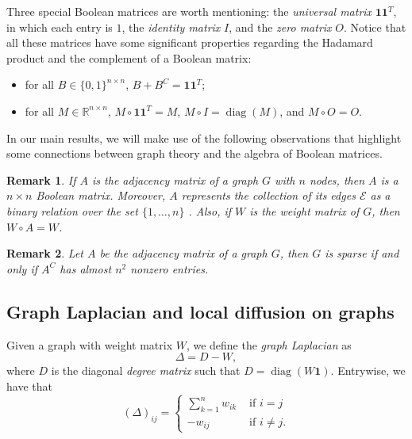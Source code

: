\documentclass[a4paper,12pt]{article}
\newtheorem{remark}{Remark}
\DeclareMathOperator{\diag}{diag}
\newcommand{\R}{\mathbb{R}}
\newcommand{\cE}{\mathcal{E}}
\newcommand{\onevec}{\mathbf{1}}
\begin{document}
Three special Boolean matrices are worth mentioning: the \emph{universal matrix} $\mathbf{1}\mathbf{1}^T$, in which each entry is $1$, the \emph{identity matrix} $I$, and the \emph{zero matrix} $O$. Notice that all these matrices have some significant properties regarding the Hadamard product and the complement of a Boolean matrix: 
\begin{itemize}
    \item for all $B\in \{0,1\}^{n \times n}$, $B + B^C = \mathbf{1}\mathbf{1}^T$;
    \item for all $M \in \R^{n \times n}$, $M \circ \mathbf{1}\mathbf{1}^T = M$, $M\circ I = \diag(M)$, and $M\circ O = O$.
\end{itemize}

In our main results, we will make use of the following observations that highlight some connections between graph theory and the algebra of Boolean matrices. 

\begin{remark}
    If $A$ is the adjacency matrix of a graph $G$ with $n$ nodes, then $A$ is a  $n\times n$ Boolean matrix. Moreover, $A$ represents the collection of its edges $\cE$ as a binary relation over the set $\{1,\dots,n\}$ \cite[Section 1.2]{kim_boolean_1982}. Also, if $W$ is the weight matrix of $G$, then $W\circ A = W$.
\end{remark}

\begin{remark} \label{rmk:dense_graphs}
Let $A$ be the adjacency matrix of a graph $G$, then $G$ is sparse if and only if $A^C$ has almost $n^2$ nonzero entries. 
   
\end{remark}

\subsection{Graph Laplacian and local diffusion on graphs} \label{subsec:graph_laplacian}
Given a graph with weight matrix $W$, we define the \emph{graph Laplacian} as
\begin{equation*} 
    \Delta = D - W,
\end{equation*}
where $D$ is the diagonal \emph{degree matrix} such that $D=\diag(W\onevec)$. Entrywise, we have that
\begin{equation*} 
(\Delta)_{ij}=
    \begin{cases}
        \sum_{k=1}^n w_{ik} & \text{ if $i= j$} \\
    -w_{ij}    & \text{ if $i\neq j$}. 
    \end{cases}
\end{equation*}
\end{document}
